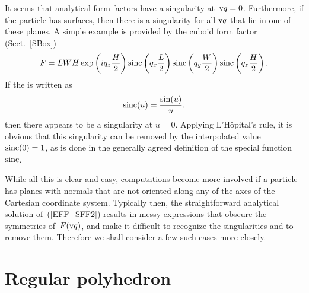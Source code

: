 %
It seems that  analytical form factors have a singularity at~$\text{v}{q}=0$.
Furthermore, if the particle has  surfaces,
then there is a singularity for all $\text{v}{q}$ that lie in one of these planes.
A simple example is provided by the cuboid form factor (Sect.~\ref{SBox})
\begin{equation}
F= L W H\exp\left(i q_z \frac{H}{2}\right) \operatorname{sinc}\left(q_x \frac{L}{2}\right)
\operatorname{sinc}\left(q_y \frac{W}{2}\right) \operatorname{sinc}\left(q_z \frac{H}{2}\right).
\end{equation}
If the  is written as
\begin{equation}
  \operatorname{sinc}(u) = \frac{\sin(u)}{u},
\end{equation}
then there appears to be a singularity at $u=0$.
Applying L'Hôpital's rule, it is obvious
that this singularity can be removed by the interpolated value
$\operatorname{sinc}(0)=1$,
as is done in the generally agreed definition of the special function~$\operatorname{sinc}$.

While all this is clear and easy,
computations become more involved
if a particle has planes with normals that are not oriented along
any of the axes of the Cartesian coordinate system.
Typically then, the straightforward analytical solution of~(\ref{EFF_SFF2})
results in messy expressions that obscure the symmetries of~$F(\text{v}{q})$,
and make it difficult to recognize the singularities and
to remove them.
Therefore we shall consider a few such cases more closely.


\section{Regular polyhedron}

\def\tqx{\alpha} %
\def\tqy{\beta}  %

